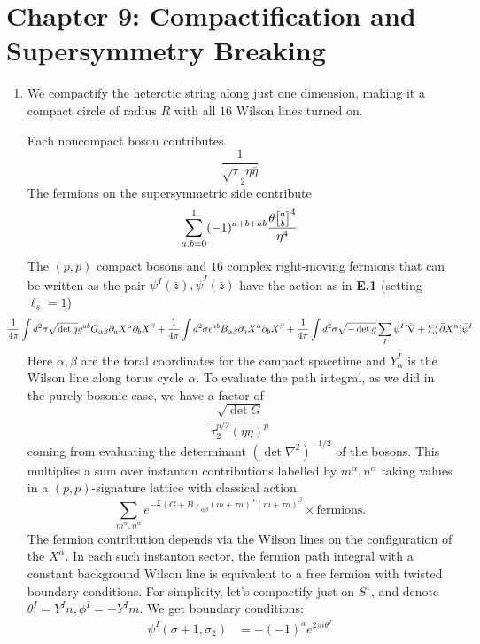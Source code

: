 \documentclass[11pt, class=article, crop=false]{standalone}
\begin{document}
\section*{Chapter 9: Compactification and Supersymmetry Breaking} %
\label{sec:chapter_9_compactification_and_supersymmetry_breaking}
	
\begin{enumerate}
	\item We compactify the heterotic string along just one dimension, making it a compact circle of radius $R$ with all $16$ Wilson lines turned on. 
	
	Each noncompact boson contributes
		\[
			\frac{1}{\sqrt \tau_2 \eta \bar \eta }
		\]
	The fermions on the supersymmetric side contribute
		\[
			\sum_{a,b=0}^1 (-1)^{a+b+ab} \frac{\theta\twist{a}{b}^4}{\eta^4}
		\]
	The $(p,p)$ compact bosons and $16$ complex right-moving fermions that can be written as the pair $\psi^I(\bar z), \bar \psi^I(\bar z)$ have the action as in \textbf{E.1} (setting $\ell_s = 1$)
		\[		\hspace{-.3in}
			\frac{1}{4\pi} \int d^2 \sigma \sqrt{\det g} g^{ab} G_{\alpha \beta} \d_a X^\alpha \d_b X^\beta + \frac{1}{4\pi} \int d^2 \sigma \epsilon^{ab} B_{\alpha \beta}\d_a X^\alpha \d_b X^\beta + \frac{1}{4\pi} \int d^2 \sigma \sqrt{- \det g} \sum_I \psi^I [\bar \nabla + Y_\alpha^I \bar \d X^\alpha] \bar \psi^I
		\]
		Here $\alpha, \beta$ are the toral coordinates for the compact spacetime and $Y^I_\alpha$ is the Wilson line along torus cycle $\alpha$. To evaluate the path integral, as we did in the purely bosonic case, we have a factor of
		\[
			\frac{\sqrt{\det G}}{\tau_2^{p/2} (\eta \bar \eta)^{p}}
		\] 
		coming from evaluating the determinant $(\det \nabla^{2})^{-1/2}$ of the bosons. This multiplies a sum over instanton contributions labelled by $m^\alpha, n^\alpha$ taking values in a $(p,p)$-signature lattice with classical action 
		\[
			\sum_{m^\alpha, n^\alpha} e^{-\frac{\pi}{\tau} (G+B)_{\alpha \beta} (m + \tau n)^\alpha (m + \bar \tau n)^\beta} \times \text{fermions}.
		\]
		The fermion contribution depends via the Wilson lines on the configuration of the $X^\alpha$. In each such instanton sector, the fermion path integral with a constant background Wilson line is equivalent to a free fermion with twisted boundary conditions. For simplicity, let's compactify just on $S^1$, and denote $\theta^I = Y^I n, \phi^I = -Y^I m$. We get boundary conditions: 
		\[
		\begin{aligned}
			\psi^I (\sigma + 1, \sigma_2) &= -(-1)^{a} e^{2 \pi i \theta^I} \\

\end{aligned}\]
\end{enumerate}
\end{document}

